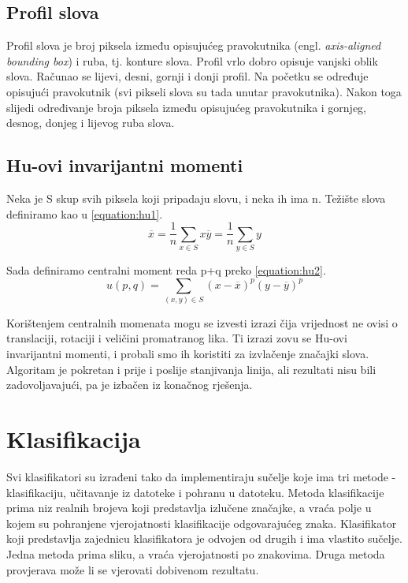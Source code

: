 \documentclass[a4paper,twocolumn,dvipdfm]{article}
\begin{document}
\subsection{Profil slova}
Profil slova je broj piksela između opisujućeg pravokutnika (engl.
\emph{axis-aligned bounding box}) i ruba, tj. konture slova. Profil vrlo dobro
opisuje vanjski oblik slova. Računao se lijevi, desni, gornji i donji profil. Na
početku se određuje opisujući pravokutnik (svi pikseli slova su tada unutar
pravokutnika). Nakon toga slijedi određivanje broja piksela između opisujućeg
pravokutnika i gornjeg, desnog, donjeg i lijevog ruba slova.

\subsection{Hu-ovi invarijantni momenti}
Neka je S skup svih piksela koji pripadaju slovu, i neka ih ima n.
Težište slova definiramo kao u \ref{equation:hu1}.
\begin{equation}
\overline{x} = \frac{1}{n}\displaystyle\sum_{x \in S}x
\overline{y} = \frac{1}{n}\displaystyle\sum_{y \in S}y
\label{equation:hu1}
\end{equation}

Sada definiramo centralni moment reda p+q preko \ref{equation:hu2}.
\begin{equation}
u(p,q) = \displaystyle\sum_{(x,y) \in S}(x-\overline{x})^p(y-\overline{y})^p
\label{equation:hu2}
\end{equation}

Korištenjem centralnih momenata mogu se izvesti izrazi čija vrijednost ne ovisi
o translaciji, rotaciji i veličini promatranog lika. Ti izrazi zovu se Hu-ovi
invarijantni momenti, i probali smo ih koristiti za izvlačenje značajki slova.
Algoritam je pokretan i prije i poslije stanjivanja linija, ali rezultati nisu
bili zadovoljavajući, pa je izbačen iz konačnog rješenja.


\section{Klasifikacija}
Svi klasifikatori su izrađeni tako da implementiraju sučelje koje ima tri metode
- klasifikaciju, učitavanje iz datoteke i pohranu u datoteku. Metoda
klasifikacije prima niz realnih brojeva koji predstavlja izlučene značajke, a
vraća polje u kojem su pohranjene vjerojatnosti klasifikacije odgovarajućeg
znaka. Klasifikator koji predstavlja zajednicu klasifikatora je odvojen od
drugih i ima vlastito sučelje. Jedna metoda prima sliku, a vraća vjerojatnosti
po znakovima. Druga metoda provjerava može li se vjerovati dobivenom rezultatu.
\end{document}
